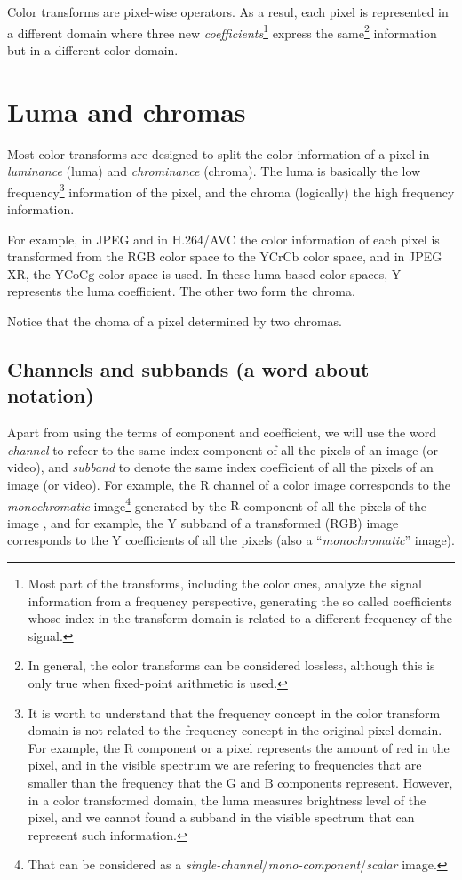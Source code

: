Color transforms are pixel-wise operators. As a resul, each pixel is
represented in a different domain where three new
\emph{coefficients}\footnote{Most part of the transforms, including
the color ones, analyze the signal information from a frequency
perspective, generating the so called coefficients whose index in the
transform domain is related to a different frequency of the signal.}
express the same\footnote{In general, the color transforms can be
considered lossless, although this is only true when fixed-point
arithmetic is used.} information but in a different color domain.

\section{Luma and chromas}

Most color transforms are designed to split the color information of a
pixel in \emph{luminance} (luma) and \emph{chrominance} (chroma). The
luma is basically the low frequency\footnote{It is worth to understand
that the frequency concept in the color transform domain is not
related to the frequency concept in the original pixel domain. For
example, the $\text{R}$ component or a pixel represents the amount of
red in the pixel, and in the visible spectrum we are refering to
frequencies that are smaller than the frequency that the $\text{G}$
and $\text{B}$ components represent. However, in a color transformed
domain, the luma measures brightness level of the pixel, and we cannot
found a subband in the visible spectrum that can represent such
information.} information of the pixel, and the chroma (logically) the
high frequency information.

For example, in JPEG and in H.264/AVC the color information of each
pixel is transformed from the $\text{RGB}$ color space to the
$\text{YCrCb}$ color space, and in JPEG XR, the $\text{YCoCg}$ color
space is used. In these luma-based color spaces, $\text{Y}$ represents
the luma coefficient. The other two form the chroma.

Notice that the choma of a pixel determined by two chromas.

\subsection*{Channels and subbands (a word about notation)}

Apart from using the terms of component and coefficient, we will use
the word \emph{channel} to refeer to the same index component of all
the pixels of an image (or video), and \emph{subband} to denote the
same index coefficient of all the pixels of an image (or video). For
example, the $\text{R}$ channel of a color image corresponds to the 
\emph{monochromatic} image\footnote{That can be considered as a
\emph{single-channel}/\emph{mono-component}/\emph{scalar}
image.} generated by the $\text{R}$ component of all the pixels of the
image , and for example, the $\text{Y}$ subband of a transformed
($\text{RGB}$) image corresponds to the $\text{Y}$ coefficients of
all the pixels (also a ``\emph{monochromatic}'' image).

